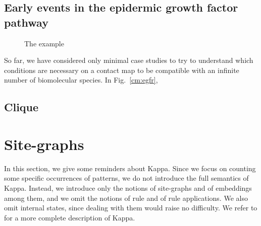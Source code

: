 \documentclass{entcs}
\begin{document}
\subsection{Early events in the epidermic growth factor pathway}

\begin{figure}[t]
\caption{The example }
 \end{figure}

So far, we have considered only minimal case studies to try to understand which conditions are necessary on a contact map to be compatible with an infinite number of biomolecular species. In Fig.~\ref{cm:egfr},


\subsection{Clique}













\section{Site-graphs}

\label{sec:kappa}

In this section, we give some reminders about Kappa.
Since we focus on counting some specific occurrences of patterns, we do not introduce the full semantics of Kappa. Instead, we introduce only the notions of site-graphs and of embeddings among them, and we omit the notions of rule and of rule applications. We also omit internal states, since dealing with them would raise no difficulty.  We refer to
\cite{DBLP:journals/tcs/DanosL04,Feret_IJSI2013} for a more complete description of Kappa.
\end{document}
